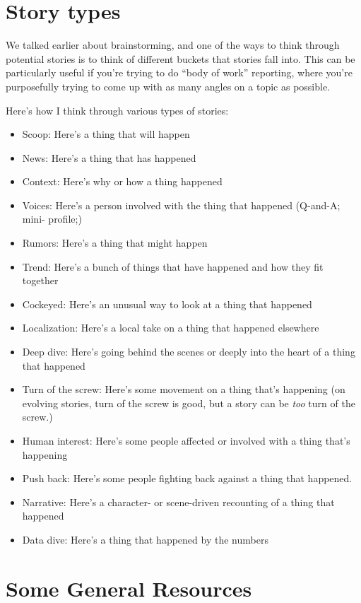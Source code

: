 \documentclass[
  11pt,
  american,
  letterpaperpaper,
  extrafontsizes,onecolumn,openright
  ]{memoir}
\providecommand{\tightlist}{%
  \setlength{\itemsep}{0pt}\setlength{\parskip}{0pt}}
\begin{document}
\hypertarget{story-types}{%
\chapter{Story types}\label{story-types}}

We talked earlier about brainstorming, and one of the ways to think through potential stories is to think of different buckets that stories fall into. This can be particularly useful if you're trying to do \enquote{body of work} reporting, where you're purposefully trying to come up with as many angles on a topic as possible.

Here's how I think through various types of stories:

\begin{itemize}
\tightlist
\item
  Scoop: Here's a thing that will happen
\item
  News: Here's a thing that has happened
\item
  Context: Here's why or how a thing happened
\item
  Voices: Here's a person involved with the thing that happened (Q-and-A; mini- profile;)
\item
  Rumors: Here's a thing that might happen
\item
  Trend: Here's a bunch of things that have happened and how they fit together
\item
  Cockeyed: Here's an unusual way to look at a thing that happened
\item
  Localization: Here's a local take on a thing that happened elsewhere
\item
  Deep dive: Here's going behind the scenes or deeply into the heart of a thing that happened
\item
  Turn of the screw: Here's some movement on a thing that's happening (on evolving stories, turn of the screw is good, but a story can be \emph{too} turn of the screw.)
\item
  Human interest: Here's some people affected or involved with a thing that's happening
\item
  Push back: Here's some people fighting back against a thing that happened.
\item
  Narrative: Here's a character- or scene-driven recounting of a thing that happened
\item
  Data dive: Here's a thing that happened by the numbers
\end{itemize}

\hypertarget{some-general-resources}{%
\chapter{Some General Resources}\label{some-general-resources}}
\end{document}
